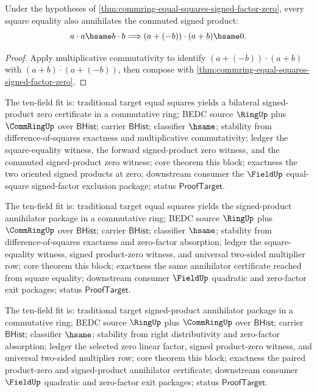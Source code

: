 \begin{theorem}
\label{thm:commring-equal-squares-commuted-signed-factor-zero}
Under the hypotheses of
\autoref{thm:commring-equal-squares-signed-factor-zero}, every square equality
also annihilates the commuted signed product:
$$
a\cdot a\hsame b\cdot b
\Longrightarrow
(a+(-b))\cdot(a+b)\hsame0 .
$$
\end{theorem}
\begin{proof}
Apply multiplicative commutativity to identify
$(a+(-b))\cdot(a+b)$ with $(a+b)\cdot(a+(-b))$, then compose with
\autoref{thm:commring-equal-squares-signed-factor-zero}.
\end{proof}



The ten-field fit is: traditional target equal squares yields a bilateral
signed-product zero certificate in a commutative ring; BEDC source $\RingUp$
plus $\CommRingUp$ over $\mathsf{BHist}$; carrier $\mathsf{BHist}$; classifier
$\hsame$; stability from difference-of-squares exactness and multiplicative
commutativity; ledger the square-equality witness, the forward signed-product
zero witness, and the commuted signed-product zero witness; core theorem this
block; exactness the two oriented signed products at zero; downstream consumer
the $\FieldUp$ equal-square signed-factor exclusion package; status
$\mathsf{ProofTarget}$.

The ten-field fit is: traditional target equal squares yields the signed-product
annihilator package in a commutative ring; BEDC source $\RingUp$ plus
$\CommRingUp$ over $\mathsf{BHist}$; carrier $\mathsf{BHist}$; classifier
$\hsame$; stability from difference-of-squares exactness and zero-factor
absorption; ledger the square-equality witness, signed product-zero witness, and
universal two-sided multiplier row; core theorem this block; exactness the same
annihilator certificate reached from square equality; downstream consumer
$\FieldUp$ quadratic and zero-factor exit packages; status
$\mathsf{ProofTarget}$.

The ten-field fit is: traditional target signed-product annihilator package in
a commutative ring; BEDC source $\RingUp$ plus $\CommRingUp$ over
$\mathsf{BHist}$; carrier $\mathsf{BHist}$; classifier $\hsame$; stability from
right distributivity and zero-factor absorption; ledger the selected zero
linear factor, signed product-zero witness, and universal two-sided multiplier
row; core theorem this block; exactness the paired product-zero and
signed-product annihilator certificate; downstream consumer $\FieldUp$
quadratic and zero-factor exit packages; status $\mathsf{ProofTarget}$.

